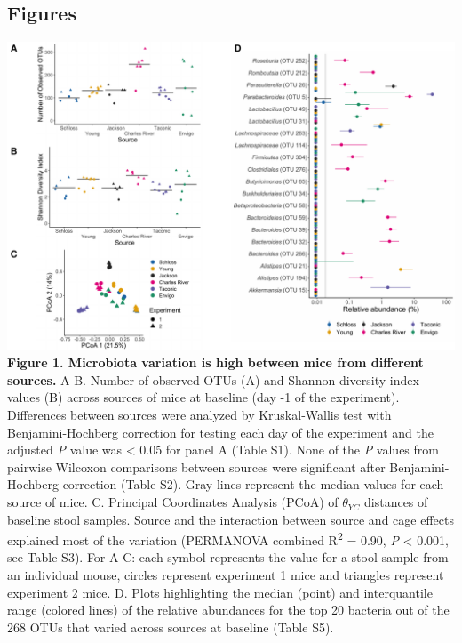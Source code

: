 \documentclass[
  11pt,
]{article}
\begin{document}
\newpage

\hypertarget{figures}{%
\subsection{Figures}\label{figures}}

\includegraphics{figure_1.pdf} \textbf{Figure 1. Microbiota variation is
high between mice from different sources.} A-B. Number of observed OTUs
(A) and Shannon diversity index values (B) across sources of mice at
baseline (day -1 of the experiment). Differences between sources were
analyzed by Kruskal-Wallis test with Benjamini-Hochberg correction for
testing each day of the experiment and the adjusted \emph{P} value was
\textless{} 0.05 for panel A (Table S1). None of the \emph{P} values
from pairwise Wilcoxon comparisons between sources were significant
after Benjamini-Hochberg correction (Table S2). Gray lines represent the
median values for each source of mice. C. Principal Coordinates Analysis
(PCoA) of \(\theta_{YC}\) distances of baseline stool samples. Source
and the interaction between source and cage effects explained most of
the variation (PERMANOVA combined R\textsuperscript{2} = 0.90, \emph{P}
\textless{} 0.001, see Table S3). For A-C: each symbol represents the
value for a stool sample from an individual mouse, circles represent
experiment 1 mice and triangles represent experiment 2 mice. D. Plots
highlighting the median (point) and interquantile range (colored lines)
of the relative abundances for the top 20 bacteria out of the 268 OTUs
that varied across sources at baseline (Table S5).

\newpage
\end{document}
